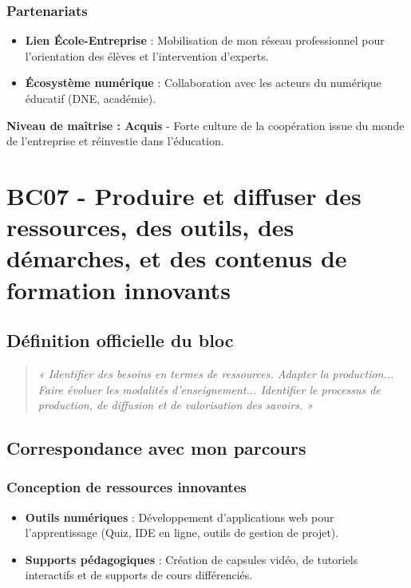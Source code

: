 \subsubsection{Partenariats}
\begin{itemize}[leftmargin=*]
    \item \textbf{Lien École-Entreprise} : Mobilisation de mon réseau professionnel pour l'orientation des élèves et l'intervention d'experts.
    \item \textbf{Écosystème numérique} : Collaboration avec les acteurs du numérique éducatif (DNE, académie).
\end{itemize}

\textbf{Niveau de maîtrise : Acquis} - Forte culture de la coopération issue du monde de l'entreprise et réinvestie dans l'éducation.

\vspace{1cm}

\section{BC07 - Produire et diffuser des ressources, des outils, des démarches, et des contenus de formation innovants}

\subsection{Définition officielle du bloc}
\begin{quote}
\textit{« Identifier des besoins en termes de ressources. Adapter la production... Faire évoluer les modalités d'enseignement... Identifier le processus de production, de diffusion et de valorisation des savoirs. »} \parencite{rncp38152}
\end{quote}

\subsection{Correspondance avec mon parcours}

\subsubsection{Conception de ressources innovantes}
\begin{itemize}[leftmargin=*]
    \item \textbf{Outils numériques} : Développement d'applications web pour l'apprentissage (Quiz, IDE en ligne, outils de gestion de projet).
    \item \textbf{Supports pédagogiques} : Création de capsules vidéo, de tutoriels interactifs et de supports de cours différenciés.
\end{itemize}

